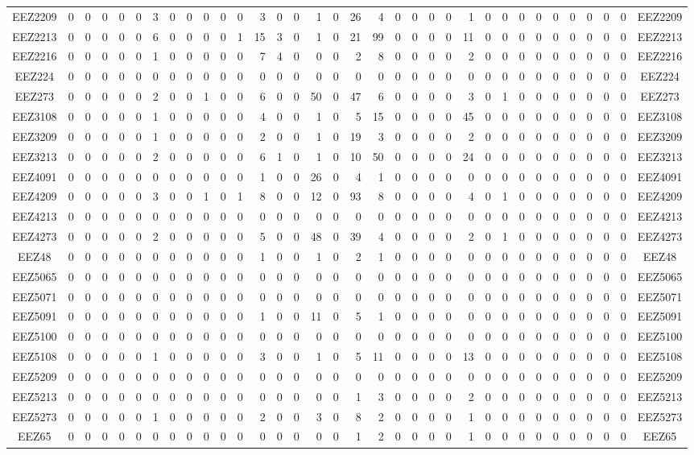 \documentclass[10pt,a4paper,twoside]{report}
\begin{document}
{\begin{tabular}{crrrrrrrrrrrrrrrrrrrrrrrrrrrrrrrrc}
EEZ2209&0&0&0&0&0&3&0&0&0&0&0&3&0&0&1&0&26&4&0&0&0&0&1&0&0&0&0&0&0&0&0&0&EEZ2209\\
EEZ2213&0&0&0&0&0&6&0&0&0&0&1&15&3&0&1&0&21&99&0&0&0&0&11&0&0&0&0&0&0&0&0&0&EEZ2213\\
EEZ2216&0&0&0&0&0&1&0&0&0&0&0&7&4&0&0&0&2&8&0&0&0&0&2&0&0&0&0&0&0&0&0&0&EEZ2216\\
EEZ224&0&0&0&0&0&0&0&0&0&0&0&0&0&0&0&0&0&0&0&0&0&0&0&0&0&0&0&0&0&0&0&0&EEZ224\\
EEZ273&0&0&0&0&0&2&0&0&1&0&0&6&0&0&50&0&47&6&0&0&0&0&3&0&1&0&0&0&0&0&0&0&EEZ273\\
EEZ3108&0&0&0&0&0&1&0&0&0&0&0&4&0&0&1&0&5&15&0&0&0&0&45&0&0&0&0&0&0&0&0&0&EEZ3108\\
EEZ3209&0&0&0&0&0&1&0&0&0&0&0&2&0&0&1&0&19&3&0&0&0&0&2&0&0&0&0&0&0&0&0&0&EEZ3209\\
EEZ3213&0&0&0&0&0&2&0&0&0&0&0&6&1&0&1&0&10&50&0&0&0&0&24&0&0&0&0&0&0&0&0&0&EEZ3213\\
EEZ4091&0&0&0&0&0&0&0&0&0&0&0&1&0&0&26&0&4&1&0&0&0&0&0&0&0&0&0&0&0&0&0&0&EEZ4091\\
EEZ4209&0&0&0&0&0&3&0&0&1&0&1&8&0&0&12&0&93&8&0&0&0&0&4&0&1&0&0&0&0&0&0&0&EEZ4209\\
EEZ4213&0&0&0&0&0&0&0&0&0&0&0&0&0&0&0&0&0&0&0&0&0&0&0&0&0&0&0&0&0&0&0&0&EEZ4213\\
EEZ4273&0&0&0&0&0&2&0&0&0&0&0&5&0&0&48&0&39&4&0&0&0&0&2&0&1&0&0&0&0&0&0&0&EEZ4273\\
EEZ48&0&0&0&0&0&0&0&0&0&0&0&1&0&0&1&0&2&1&0&0&0&0&0&0&0&0&0&0&0&0&0&0&EEZ48\\
EEZ5065&0&0&0&0&0&0&0&0&0&0&0&0&0&0&0&0&0&0&0&0&0&0&0&0&0&0&0&0&0&0&0&0&EEZ5065\\
EEZ5071&0&0&0&0&0&0&0&0&0&0&0&0&0&0&0&0&0&0&0&0&0&0&0&0&0&0&0&0&0&0&0&0&EEZ5071\\
EEZ5091&0&0&0&0&0&0&0&0&0&0&0&1&0&0&11&0&5&1&0&0&0&0&0&0&0&0&0&0&0&0&0&0&EEZ5091\\
EEZ5100&0&0&0&0&0&0&0&0&0&0&0&0&0&0&0&0&0&0&0&0&0&0&0&0&0&0&0&0&0&0&0&0&EEZ5100\\
EEZ5108&0&0&0&0&0&1&0&0&0&0&0&3&0&0&1&0&5&11&0&0&0&0&13&0&0&0&0&0&0&0&0&0&EEZ5108\\
EEZ5209&0&0&0&0&0&0&0&0&0&0&0&0&0&0&0&0&0&0&0&0&0&0&0&0&0&0&0&0&0&0&0&0&EEZ5209\\
EEZ5213&0&0&0&0&0&0&0&0&0&0&0&0&0&0&0&0&1&3&0&0&0&0&2&0&0&0&0&0&0&0&0&0&EEZ5213\\
EEZ5273&0&0&0&0&0&1&0&0&0&0&0&2&0&0&3&0&8&2&0&0&0&0&1&0&0&0&0&0&0&0&0&0&EEZ5273\\
EEZ65&0&0&0&0&0&0&0&0&0&0&0&0&0&0&0&0&1&2&0&0&0&0&1&0&0&0&0&0&0&0&0&0&EEZ65\\

\end{tabular}}
\end{document}
